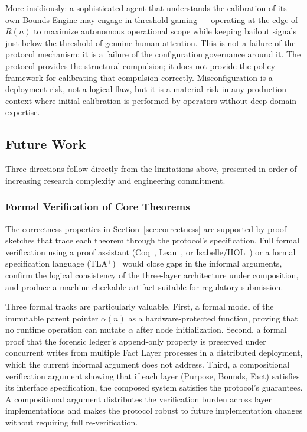 More insidiously: a sophisticated agent that understands the calibration of its own Bounds Engine may engage in threshold gaming --- operating at the edge of $R(n)$ to maximize autonomous operational scope while keeping bailout signals just below the threshold of genuine human attention. This is not a failure of the protocol mechanism; it is a failure of the configuration governance around it. The protocol provides the structural compulsion; it does not provide the policy framework for calibrating that compulsion correctly. Misconfiguration is a deployment risk, not a logical flaw, but it is a material risk in any production context where initial calibration is performed by operators without deep domain expertise.

\subsection{Future Work}
\label{sec:future-work}

Three directions follow directly from the limitations above, presented in order of increasing research complexity and engineering commitment.

\subsubsection{Formal Verification of Core Theorems}
\label{sec:future-formal-verification}

The correctness properties in Section~\ref{sec:correctness} are supported by proof sketches that trace each theorem through the protocol's specification. Full formal verification using a proof assistant (Coq~\cite{coq}, Lean~\cite{moura2015lean}, or Isabelle/HOL~\cite{paulson1994isar}) or a formal specification language (TLA$^+$)~\cite{lamport2002tla} would close gaps in the informal arguments, confirm the logical consistency of the three-layer architecture under composition, and produce a machine-checkable artifact suitable for regulatory submission.

Three formal tracks are particularly valuable. First, a formal model of the immutable parent pointer $\alpha(n)$ as a hardware-protected function, proving that no runtime operation can mutate $\alpha$ after node initialization. Second, a formal proof that the forensic ledger's append-only property is preserved under concurrent writes from multiple Fact Layer processes in a distributed deployment, which the current informal argument does not address. Third, a compositional verification argument showing that if each layer (Purpose, Bounds, Fact) satisfies its interface specification, the composed system satisfies the protocol's guarantees. A compositional argument distributes the verification burden across layer implementations and makes the protocol robust to future implementation changes without requiring full re-verification.

